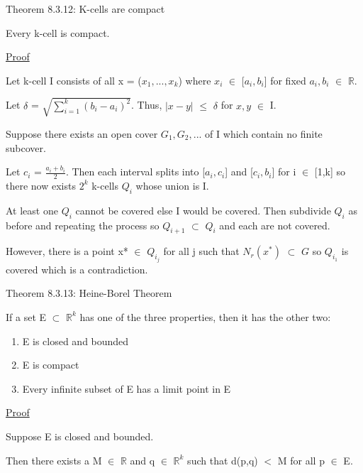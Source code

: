 { \color{red} Theorem 8.3.12: K-cells are compact } 

	\begin{adjustbox}{minipage=14cm, right, vspace=0.1cm 0cm}
		Every k-cell is compact.
	\end{adjustbox}

{ \color{magenta} \underline{Proof} } 

	Let k-cell I consists of all x = ($x_1, ... , x_k$) where
	$x_i$ $\in$ [$a_i,b_i$] for fixed $a_i,b_i$ $\in$ $\mathbb{R}$.

	Let $\delta$ = $\sqrt{\sum_{i=1}^{k} (b_i - a_i)^2}$.
	Thus, $|x-y|$ $\leq$ $\delta$ for $x,y$ $\in$ I.

	Suppose there exists an open cover $G_1, G_2, ...$ of I which
	contain no finite subcover.

	Let $c_i$ = $\frac{a_i+b_i}{2}$.
	Then each interval splits into [$a_i,c_i$] and [$c_i,b_i$]
	for i $\in$ [1,k] so there now exists $2^k$ k-cells $Q_i$
	whose union is I.

	At least one $Q_i$ cannot be covered else I would be covered.
	Then subdivide $Q_i$ as before and repeating the process
	so $Q_{i+1}$ $\subset$ $Q_i$ and each are not covered.

	However, there is a point x* $\in$ $Q_{i_j}$ for all j
	such that $N_r(x^*)$ $\subset$ $G$ so $Q_{i_1}$ is covered
	which is a contradiction. \\

\newpage

{ \color{red} Theorem 8.3.13: Heine-Borel Theorem } 

	\begin{adjustbox}{minipage=14cm, right, vspace=0.1cm 0cm}
		If a set E $\subset$ $\mathbb{R}^k$ has one of the three properties,
		then it has the other two:
	\end{adjustbox}

	\begin{enumerate}[label=(\alph*), leftmargin=2cm, itemsep=0.1cm]
		\item E is closed and bounded
		\item E is compact
		\item Every infinite subset of E has a limit point in E
	\end{enumerate}

{ \color{magenta} \underline{Proof} } 

	Suppose E is closed and bounded.

	Then there exists a M $\in$ $\mathbb{R}$ and q $\in$ $\mathbb{R}^k$
	such that d(p,q) $<$ M for all p $\in$ E.
	
